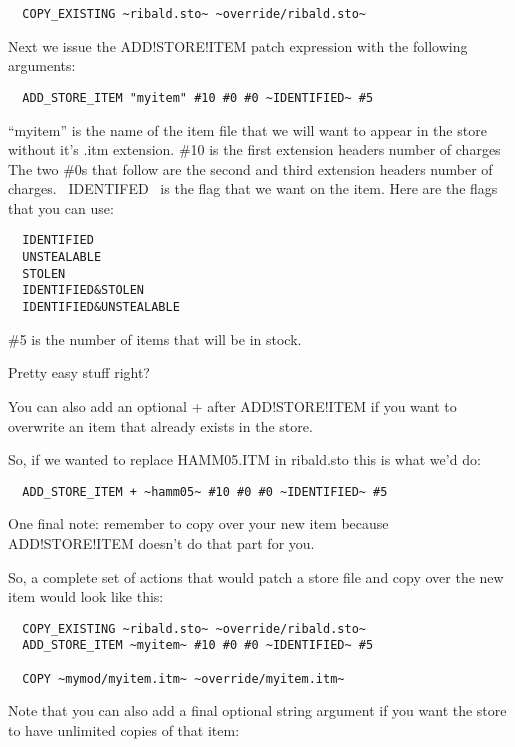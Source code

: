 \documentclass{article}
\begin{document}
\begin{verbatim}
  COPY_EXISTING ~ribald.sto~ ~override/ribald.sto~
\end{verbatim}

  Next we issue the ADD!STORE!ITEM patch expression with the following
  arguments:

\begin{verbatim}
  ADD_STORE_ITEM "myitem" #10 #0 #0 ~IDENTIFIED~ #5
\end{verbatim}

  ``myitem'' is the name of the item file that we will want to appear in the
  store without it's .itm extension.
  \#10 is the first extension headers number of charges
  The two \#0s that follow are the second and third extension headers number
  of charges.
  ~IDENTIFED~ is the flag that we want on the item.  Here are the flags
  that you can use:

\begin{verbatim}
  IDENTIFIED
  UNSTEALABLE
  STOLEN
  IDENTIFIED&STOLEN
  IDENTIFIED&UNSTEALABLE
\end{verbatim}

  \#5 is the number of items that will be in stock.

  Pretty easy stuff right?

  You can also add an optional + after ADD!STORE!ITEM if you want to
  overwrite an item that already exists in the store.

  So, if we wanted to replace HAMM05.ITM in ribald.sto this is what we'd
  do:

\begin{verbatim}
  ADD_STORE_ITEM + ~hamm05~ #10 #0 #0 ~IDENTIFIED~ #5
\end{verbatim}

  One final note: remember to copy over your new item because
  ADD!STORE!ITEM doesn't do that part for you.

  So, a complete set of actions that would patch a store file and copy over
  the new item would look like this:

\begin{verbatim}
  COPY_EXISTING ~ribald.sto~ ~override/ribald.sto~
  ADD_STORE_ITEM ~myitem~ #10 #0 #0 ~IDENTIFIED~ #5

  COPY ~mymod/myitem.itm~ ~override/myitem.itm~
\end{verbatim}

  Note that you can also add a final optional string argument if you want
  the store to have unlimited copies of that item:
\end{document}
